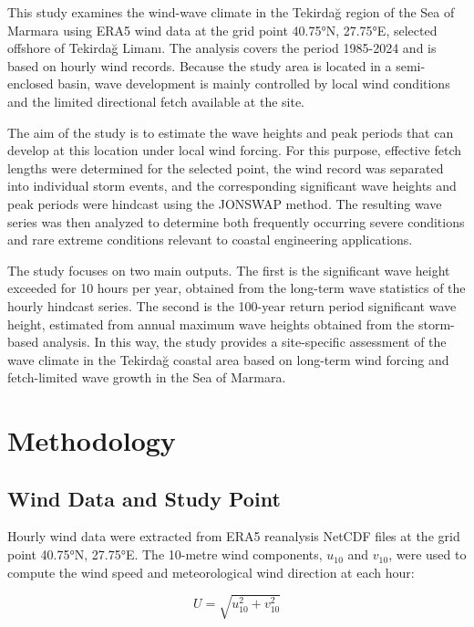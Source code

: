 \documentclass[a4paper, 11pt]{article}
\begin{document}
\hspace*{0.5cm}This study examines the wind-wave climate in the Tekirdağ region of the Sea of Marmara using ERA5 wind data at the grid point 
40.75°N, 27.75°E, selected offshore of Tekirdağ Limanı. The analysis covers the period 1985-2024 and is based on hourly wind records. Because the study area is located in a semi-enclosed basin, wave development is mainly controlled by local wind conditions and the limited directional fetch available at the site.

The aim of the study is to estimate the wave heights and peak periods that can develop at this location under local wind forcing. For this purpose, effective fetch lengths were determined for the selected point, the wind record was separated into individual storm events, and the corresponding significant wave heights and peak periods were hindcast using the JONSWAP method. The resulting wave series was then analyzed to determine both frequently occurring severe conditions and rare extreme conditions relevant to coastal engineering applications.

The study focuses on two main outputs. The first is the significant wave height exceeded for 10 hours per year, obtained from the long-term wave statistics of the hourly hindcast series. The second is the 100-year return period significant wave height, estimated from annual maximum wave heights obtained from the storm-based analysis. In this way, the study provides a site-specific assessment of the wave climate in the Tekirdağ coastal area based on long-term wind forcing and fetch-limited wave growth in the Sea of Marmara.

\section{Methodology}

\subsection{Wind Data and Study Point}

\hspace*{0.5cm}Hourly wind data were extracted from ERA5 reanalysis NetCDF files at the grid point 40.75°N, 27.75°E. The 10-metre wind components, $u_{10}$ and $v_{10}$, were used to compute the wind speed and meteorological wind direction at each hour:

\begin{equation}
    U = \sqrt{u_{10}^2 + v_{10}^2}
\end{equation}
\end{document}
